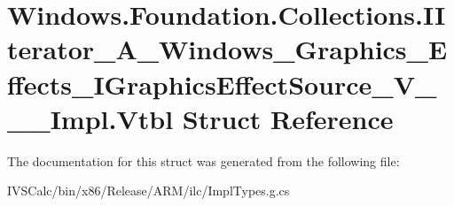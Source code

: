 \hypertarget{struct_windows_1_1_foundation_1_1_collections_1_1_i_iterator___a___windows___graphics___effects_7faf78f99b441e0cf59449a59f0dc703}{}\section{Windows.\+Foundation.\+Collections.\+I\+Iterator\+\_\+\+A\+\_\+\+Windows\+\_\+\+Graphics\+\_\+\+Effects\+\_\+\+I\+Graphics\+Effect\+Source\+\_\+\+V\+\_\+\+\_\+\+\_\+\+Impl.\+Vtbl Struct Reference}
\label{struct_windows_1_1_foundation_1_1_collections_1_1_i_iterator___a___windows___graphics___effects_7faf78f99b441e0cf59449a59f0dc703}


The documentation for this struct was generated from the following file\+:\begin{DoxyCompactItemize}
\item 
I\+V\+S\+Calc/bin/x86/\+Release/\+A\+R\+M/ilc/Impl\+Types.\+g.\+cs\end{DoxyCompactItemize}
